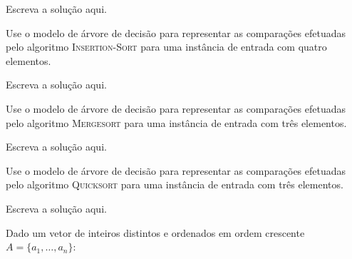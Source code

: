 \documentclass[a4paper]{exam}
\begin{document}
\begin{questions}
  \begin{solution}
    Escreva a solução aqui.
  \end{solution}
  \question Use o modelo de árvore de decisão para representar as
  comparações efetuadas pelo algoritmo \textsc{Insertion-Sort} para
  uma instância de entrada com quatro elementos.
  \begin{solution}
    Escreva a solução aqui.
  \end{solution}
  \question Use o modelo de árvore de decisão para representar as
  comparações efetuadas pelo algoritmo \textsc{Mergesort} para uma instância
  de entrada com três elementos.
  \begin{solution}
    Escreva a solução aqui.
  \end{solution}
  \question Use o modelo de árvore de decisão para representar as
  comparações efetuadas pelo algoritmo \textsc{Quicksort} para uma
  instância de entrada com três elementos.
  \begin{solution}
    Escreva a solução aqui.
  \end{solution}
  \question Dado um vetor de inteiros distintos e ordenados em
  ordem crescente $A = \{a_1, \ldots, a_n\}$:
\end{questions}
\end{document}
